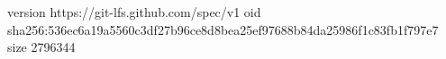 version https://git-lfs.github.com/spec/v1
oid sha256:536ec6a19a5560c3df27b96ce8d8bea25ef97688b84da25986f1c83fb1f797e7
size 2796344
